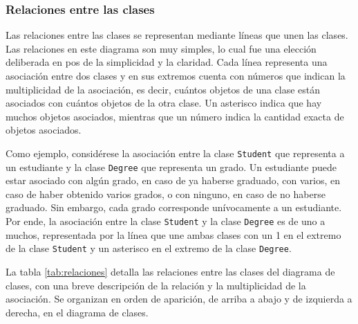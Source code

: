 \subsubsection{Relaciones entre las clases}

Las relaciones entre las clases se representan mediante líneas que unen las clases. Las relaciones en este diagrama son muy simples, lo cual fue una elección deliberada en pos de la simplicidad y la claridad. Cada línea representa una asociación entre dos clases y en sus extremos cuenta con números que indican la multiplicidad de la asociación, es decir, cuántos objetos de una clase están asociados con cuántos objetos de la otra clase. Un asterisco indica que hay muchos objetos asociados, mientras que un número indica la cantidad exacta de objetos asociados. 

Como ejemplo, considérese la asociación entre la clase \texttt{Student} que representa a un estudiante y la clase \texttt{Degree} que representa un grado. Un estudiante puede estar asociado con algún grado, en caso de ya haberse graduado, con varios, en caso de haber obtenido varios grados, o con ninguno, en caso de no haberse graduado. Sin embargo, cada grado corresponde unívocamente a un estudiante. Por ende, la asociación entre la clase \texttt{Student} y la clase \texttt{Degree} es de uno a muchos, representada por la línea que une ambas clases con un 1 en el extremo de la clase \texttt{Student} y un asterisco en el extremo de la clase \texttt{Degree}.

La tabla \ref{tab:relaciones} detalla las relaciones entre las clases del diagrama de clases, con una breve descripción de la relación y la multiplicidad de la asociación. Se organizan en orden de aparición, de arriba a abajo y de izquierda a derecha, en el diagrama de clases.


